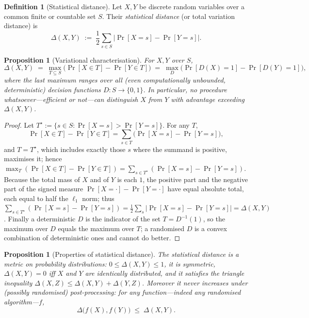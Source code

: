 \documentclass[11pt,a4paper]{article}
\newtheorem{proposition}[theorem]{Proposition}
\theoremstyle{definition}
\newtheorem{definition}[theorem]{Definition}
\theoremstyle{remark}
\begin{document}
\begin{definition}[Statistical distance]\label{model:def:statdist}
Let \(X, Y\) be discrete random variables over a common finite or countable set
\(S\). Their \emph{statistical distance} (or total variation distance) is
\[
  \Delta(X, Y) \;:=\; \frac{1}{2} \sum_{s \in S}
    \bigl| \Pr[X = s] - \Pr[Y = s] \bigr| .
\]
\end{definition}

\begin{proposition}[Variational characterisation]\label{model:prop:statdist}
For \(X, Y\) over \(S\),
\[
  \Delta(X, Y) \;=\; \max_{T \subseteq S}
    \bigl( \Pr[X \in T] - \Pr[Y \in T] \bigr)
  \;=\; \max_{D} \bigl( \Pr[D(X) = 1] - \Pr[D(Y) = 1] \bigr),
\]
where the last maximum ranges over all (even computationally unbounded,
deterministic) decision functions \(D : S \to \{0,1\}\). In particular, no
procedure whatsoever---efficient or not---can distinguish \(X\) from \(Y\) with
advantage exceeding \(\Delta(X,Y)\).
\end{proposition}

\begin{proof}
Let \(T^\star := \{ s \in S : \Pr[X = s] > \Pr[Y = s]\}\). For any \(T\),
\[
  \Pr[X \in T] - \Pr[Y \in T] = \sum_{s \in T}\bigl(\Pr[X=s]-\Pr[Y=s]\bigr),
\]
and \(T = T^\star\), which includes exactly those \(s\) where the summand is
positive, maximises it; hence
\(\max_T(\Pr[X\in T]-\Pr[Y\in T]) = \sum_{s\in T^\star}(\Pr[X=s]-\Pr[Y=s])\).
Because the total mass of \(X\) and of \(Y\) is each \(1\), the positive part and
the negative part of the signed measure \(\Pr[X=\cdot]-\Pr[Y=\cdot]\) have equal
absolute total, each equal to half the \(\ell_1\) norm; thus
\(\sum_{s\in T^\star}(\Pr[X=s]-\Pr[Y=s]) = \tfrac12\sum_s|\Pr[X=s]-\Pr[Y=s]| =
\Delta(X,Y)\). Finally a deterministic \(D\) is the indicator of the set
\(T = D^{-1}(1)\), so the maximum over \(D\) equals the maximum over \(T\); a
randomised \(D\) is a convex combination of deterministic ones and cannot do
better.
\end{proof}

\begin{proposition}[Properties of statistical distance]\label{model:prop:statdist-props}
The statistical distance is a metric on probability distributions:
\(0 \leq \Delta(X,Y) \leq 1\), it is symmetric, \(\Delta(X,Y)=0\) iff \(X\) and
\(Y\) are identically distributed, and it satisfies the triangle inequality
\(\Delta(X,Z) \leq \Delta(X,Y)+\Delta(Y,Z)\). Moreover it never increases under
(possibly randomised) post-processing: for any function---indeed any randomised
algorithm---\(f\),
\[
  \Delta\bigl(f(X), f(Y)\bigr) \;\leq\; \Delta(X, Y).
\]
\end{proposition}
\end{document}
